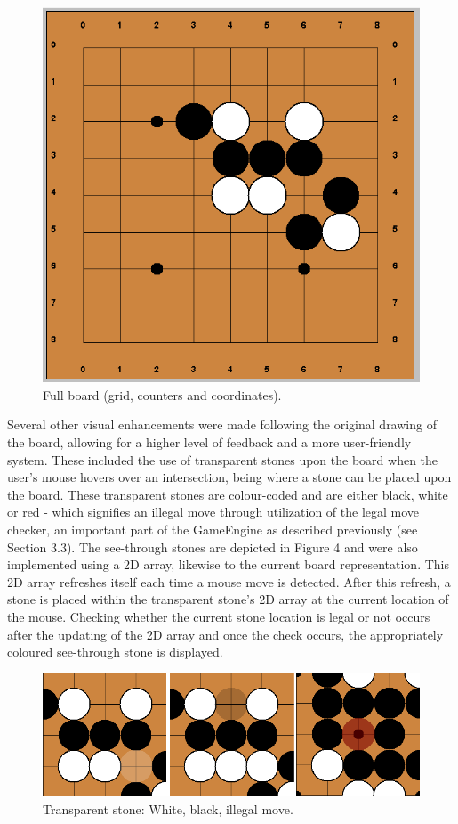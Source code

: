 \documentclass{l3proj}
\begin{document}
\begin{figure}[H]
\centering
\includegraphics[scale=0.5]{Images/GUI-3-CountersCoords.png}
\caption{Full board (grid, counters and coordinates).}
\end{figure}

Several other visual enhancements were made following the original drawing of the board, allowing for a higher level of feedback and a more user-friendly system. These included the use of transparent stones upon the board when the user's mouse hovers over an intersection, being where a stone can be placed upon the board. These transparent stones are colour-coded and are either black, white or red - which signifies an illegal move through utilization of the legal move checker, an important part of the GameEngine as described previously (see Section 3.3). The see-through stones are depicted in Figure 4 and were also implemented using a 2D array, likewise to the current board representation. This 2D array refreshes itself each time a mouse move is detected. After this refresh, a stone is placed within the transparent stone's 2D array at the current location of the mouse. Checking whether the current stone location is legal or not occurs after the updating of the 2D array and once the check occurs, the appropriately coloured see-through stone is displayed.

\begin{figure}[H]
\centering
\includegraphics[scale=0.7]{Images/GUI-4-Transparent.png}
\caption{Transparent stone: White, black, illegal move.}
\end{figure}
\end{document}
